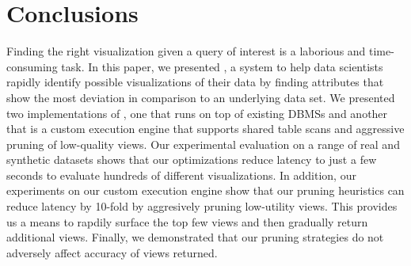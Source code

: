 
\section{Conclusions}
\label{sec:conc}

Finding the right visualization given a query of interest is a
laborious and time-consuming task.
In this paper, we presented \VizRecDB, a system to help data scientists 
rapidly identify possible visualizations of their data by finding
attributes that show the most deviation in comparison to an underlying data set.
We presented two implementations of \VizRecDB, one that runs on top of existing
DBMSs and another that is a custom execution engine that supports shared table scans
and aggressive pruning of low-quality views.
Our experimental evaluation on a range of real and synthetic datasets shows that
our optimizations reduce latency to just a few seconds to evaluate hundreds of different
visualizations.
In addition, our experiments on our custom execution engine show that our pruning
heuristics can reduce latency by 10-fold by aggresively pruning low-utility views.
This provides us a means to rapdily surface the top few views and then
gradually return additional views.
Finally, we demonstrated that our pruning
strategies do not adversely affect accuracy of views returned.
